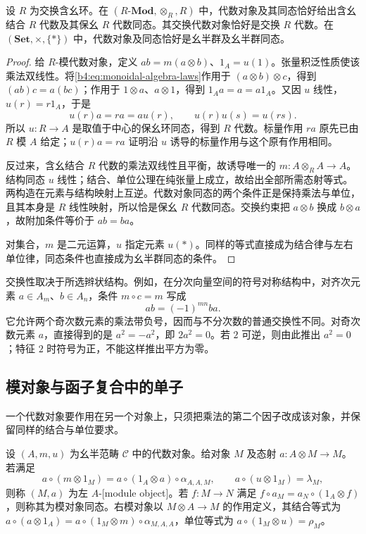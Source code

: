 \begin{proposition}\label{b4:prop:monoidal-ordinary-algebras}
	设 \(R\) 为交换含幺环。在 \((R\text{-}\mathbf{Mod},\otimes_R,R)\) 中，代数对象及其同态恰好给出含幺结合 \(R\) 代数及其保幺 \(R\) 代数同态。其交换代数对象恰好是交换 \(R\) 代数。在 \((\mathbf{Set},\times,\{*\})\) 中，代数对象及同态恰好是幺半群及幺半群同态。
\end{proposition}
\begin{proof}
	给 \(R\)-模代数对象，定义 \(ab=m(a\otimes b)\)、\(1_A=u(1)\)。张量积泛性质使该乘法双线性。将\eqref{b4:eq:monoidal-algebra-laws}作用于 \((a\otimes b)\otimes c\)，得到 \((ab)c=a(bc)\)；作用于 \(1\otimes a\)、\(a\otimes1\)，得到 \(1_Aa=a=a1_A\)。又因 \(u\) 线性，\(u(r)=r1_A\)，于是
	\[
		u(r)a=ra=au(r),\qquad u(r)u(s)=u(rs).
	\]
	所以 \(u:R\to A\) 是取值于中心的保幺环同态，得到 \(R\) 代数。标量作用 \(ra\) 原先已由 \(R\) 模 \(A\) 给定；\(u(r)a=ra\) 证明沿 \(u\) 诱导的标量作用与这个原有作用相同。

	反过来，含幺结合 \(R\) 代数的乘法双线性且平衡，故诱导唯一的 \(m:A\otimes_RA\to A\)。结构同态 \(u\) 线性；结合、单位公理在纯张量上成立，故给出全部所需态射等式。两构造在元素与结构映射上互逆。代数对象同态的两个条件正是保持乘法与单位，且其本身是 \(R\) 线性映射，所以恰是保幺 \(R\) 代数同态。交换约束把 \(a\otimes b\) 换成 \(b\otimes a\)，故附加条件等价于 \(ab=ba\)。

	对集合，\(m\) 是二元运算，\(u\) 指定元素 \(u(*)\)。同样的等式直接成为结合律与左右单位律，同态条件也直接成为幺半群同态的条件。
\end{proof}

交换性取决于所选辫状结构。例如，在分次向量空间的符号对称结构中，对齐次元素 \(a\in A_m\)、\(b\in A_n\)，条件 \(m\circ c=m\) 写成
\[
	ab=(-1)^{mn}ba.
\]
它允许两个奇次数元素的乘法带负号，因而与不分次数的普通交换性不同。对奇次数元素 \(a\)，直接得到的是 \(a^2=-a^2\)，即 \(2a^2=0\)。若 \(2\) 可逆，则由此推出 \(a^2=0\)；特征 \(2\) 时符号为正，不能这样推出平方为零。

\subsection{模对象与函子复合中的单子}
\label{b4:subsec:monoidal-module-objects}

一个代数对象要作用在另一个对象上，只须把乘法的第二个因子改成该对象，并保留同样的结合与单位要求。

\begin{definition}\label{b4:def:monoidal-module-object}
	设 \((A,m,u)\) 为幺半范畴 \(\mathcal C\) 中的代数对象。给对象 \(M\) 及态射 \(a:A\otimes M\to M\)。若满足
	\[
		a\circ(m\otimes1_M)=a\circ(1_A\otimes a)\circ\alpha_{A,A,M}, \qquad a\circ(u\otimes1_M)=\lambda_M,
	\]
	则称 \((M,a)\) 为左 \(A\)-[module object]。若 \(f:M\to N\) 满足 \(f\circ a_M=a_N\circ(1_A\otimes f)\)，则称其为模对象同态。右模对象以 \(M\otimes A\to M\) 的作用定义，其结合等式为 \(a\circ(a\otimes1_A)=a\circ(1_M\otimes m)\circ\alpha_{M,A,A}\)，单位等式为 \(a\circ(1_M\otimes u)=\rho_M\)。
\end{definition}

